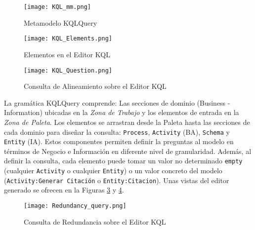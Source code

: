 \begin{figure} [!t]
\begin{center}
	\texttt{[image: KQL\_mm.png]}
	\caption{Metamodelo KQLQuery}
	\label{fig:KQL_mm}
\end{center}	
\end{figure}

\begin{figure} [!t]
\begin{center}
	\texttt{[image: KQL\_Elements.png]}
	\caption{Elementos en el Editor KQL}
	\label{fig:KQL_els}
\end{center}	
\end{figure}

\begin{figure} [!t]
\begin{center}
	\texttt{[image: KQL\_Question.png]}
	\caption{Consulta de Alineamiento sobre el Editor KQL}
	\label{fig:KQL}
\end{center}	
\end{figure}


La gram\'atica KQLQuery comprende: Las secciones de dominio (Business - Information) ubicadas en la \textit{Zona de Trabajo} y los elementos de entrada en la \textit{Zona de Paleta}. Los elementos se arrastran desde la Paleta hasta las secciones de cada dominio para dise\~nar la consulta: \texttt{Process}, \texttt{Activity} (BA), \texttt{Schema} y \texttt{Entity} (IA). Estos componentes permiten definir la preguntas al modelo en t\'erminos de Negocio e Informaci\'on en diferente nivel de granularidad. Adem\'as, al definir la consulta, cada elemento puede tomar un valor no determinado \texttt{empty} (cualquier \texttt{Activity} o cualquier \texttt{Entity}) o un valor concreto del modelo (\texttt{Activity:Generar Citaci\'on} o \texttt{Entity:Citacion}). Unas vistas del editor generado se ofrecen en la Figuras \ref{fig:KQL} y \ref{fig:KQL_red}.

\begin{figure} [!t]
\begin{center}
	\texttt{[image: Redundancy\_query.png]}
	\caption{Consulta de Redundancia sobre el Editor KQL}
	\label{fig:KQL_red}
\end{center}	
\end{figure}


